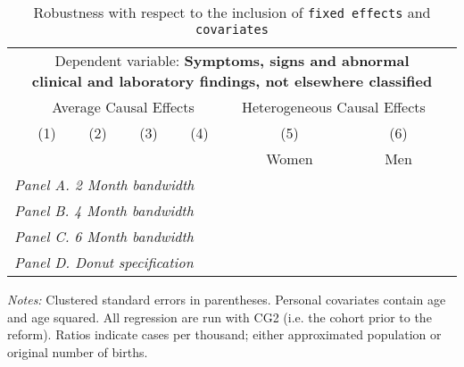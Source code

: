  \begin{table}[H] \begin{threeparttable} \centering \caption{Robustness with respect to the inclusion of \texttt{fixed effects} and \texttt{covariates}} {\def\sym#1{\ifmmode^{#1}\else\(^{#1}\)\fi} \begin{tabular}{l*{7}{c}} \toprule & \multicolumn{6}{c}{Dependent variable: \textbf{Symptoms, signs and abnormal clinical and laboratory findings, not elsewhere classified}} \\ \cmidrule(lr){2-7}
            &\multicolumn{4}{c}{Average Causal Effects}         &\multicolumn{2}{c}{Heterogeneous Causal Effects}\\\cmidrule(lr){2-5}\cmidrule(lr){6-7}
            &\multicolumn{1}{c}{(1)}&\multicolumn{1}{c}{(2)}&\multicolumn{1}{c}{(3)}&\multicolumn{1}{c}{(4)}&\multicolumn{1}{c}{(5)}&\multicolumn{1}{c}{(6)}\\
            &\multicolumn{1}{c}{}&\multicolumn{1}{c}{}&\multicolumn{1}{c}{}&\multicolumn{1}{c}{}&\multicolumn{1}{c}{Women}&\multicolumn{1}{c}{Men}\\
\midrule
 \multicolumn{7}{l}{\emph{Panel A. 2 Month bandwidth}} \\    \midrule\multicolumn{7}{l}{\emph{Panel B. 4 Month bandwidth}} \\    \midrule\multicolumn{7}{l}{\emph{Panel C. 6 Month bandwidth}} \\    \midrule\multicolumn{7}{l}{\emph{Panel D. Donut specification}} \\    \midrule  
\bottomrule \end{tabular} } \begin{tablenotes} \item \scriptsize \emph{Notes:} Clustered standard errors in parentheses. Personal covariates contain age and age squared. All regression are run with CG2 (i.e. the cohort prior to the reform). Ratios indicate cases per thousand; either approximated population or original number of births. \end{tablenotes} \end{threeparttable} \end{table} 

